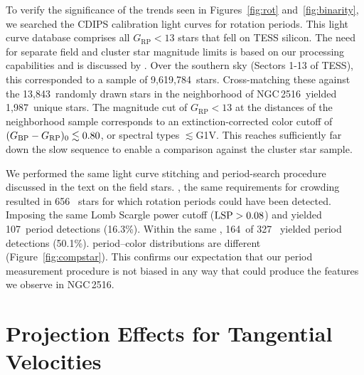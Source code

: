 \documentclass[12pt,twocolumn,tighten]{aastex63}
\newcommand{\cn}{NGC\,2516} %
\newcommand{\nnbhd}{13{,}843} %
\newcommand{\ncalibration}{9{,}619{,}784} %
\newcommand{\nnbhdcalibstar}{1{,}987} %
\newcommand{\ncompstardenominator}{656} %
\newcommand{\ncompstarnumerator}{107} %
\newcommand{\ncompfrac}{16.3\%} %
\newcommand{\nautovscompstardenominator}{327} %
\newcommand{\nautovscompstarnumerator}{164} %
\newcommand{\nautofrac}{50.1\%} %
\newcommand{\bpmrpo}{(G_{\rm BP}-G_{\rm RP})_0}
\begin{document}
To verify the significance of the trends seen in Figures~\ref{fig:rot}
and~\ref{fig:binarity}, we searched the CDIPS calibration light curves
for rotation periods.  This light curve database comprises all $G_\mathrm{RP}<13$
stars that fell on TESS silicon. The need for separate field and
cluster star magnitude limits is based on our processing capabilities and is discussed
by \citet{bouma_cdipsI_2019}.  Over the southern sky (Sectors 1-13 of
TESS), this corresponded to a sample of \ncalibration\ stars.
Cross-matching these against the \nnbhd\ randomly drawn stars in the
neighborhood of \cn\ yielded \nnbhdcalibstar\ unique stars.  The
magnitude cut of $G_\mathrm{RP}<13$ at the distances of the neighborhood sample
corresponds to an extinction-corrected color cutoff of $\bpmrpo
\lesssim 0.80$, or spectral types $\lesssim$G1V.  This reaches
sufficiently far down the slow sequence to enable a comparison against
the cluster star sample.


We performed the same light curve stitching and period-search
procedure discussed in the text on the field stars.
\replaced{Imposing}{Within $0.4<\bpmrpo<0.8$}, the same requirements
for crowding resulted in \ncompstardenominator\  stars
for which rotation periods could have been detected.  Imposing the
same Lomb Scargle power cutoff (${\rm LSP}>0.08$) and  yielded \ncompstarnumerator\ period
detections (\ncompfrac).  Within the same , \nautovscompstarnumerator\ of
\nautovscompstardenominator\  yielded period detections
(\nautofrac).  period--color distributions
are  different (Figure~\ref{fig:compstar}).  This confirms our
expectation that our period measurement procedure is not biased in any
way that could produce the features we observe in \cn.


\section{Projection Effects for Tangential Velocities}
\label{app:vproj}
\end{document}
